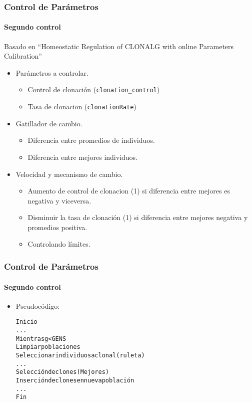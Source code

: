 \frame
{
\frametitle{Control de Parámetros}
\framesubtitle{Segundo control}
Basado en ``Homeostatic Regulation of CLONALG with online Parameters Calibration''
\begin{itemize}
	\item Parámetros a controlar.
	\begin{itemize}
		\item Control de clonación (\texttt{clonation\_control}) 
		\item Tasa de clonacion (\texttt{clonationRate}) \blue{[0,1]} 
	\end{itemize}
	\item Gatillador de cambio.
	\begin{itemize}
		\item Diferencia entre promedios de individuos.
		\item Diferencia entre mejores individuos.
	\end{itemize}
	\item Velocidad y mecanismo de cambio.
	\begin{itemize}
		\item Aumento de control de clonacion (1) si diferencia entre mejores es negativa y viceversa.
		\item Disminuir la tasa de clonación (1) si diferencia entre mejores negativa y promedios positiva.
		\item Controlando límites.
	\end{itemize}
\end{itemize}
}

\begin{frame}[t,fragile]
\frametitle{Control de Parámetros}
\framesubtitle{Segundo control}
\begin{itemize}
	\item Pseudocódigo:
\tiny{
\begin{alltt}
    Inicio
	...
    Mientras g < GENS
        Limpiar poblaciones
        Seleccionar individuos a clonal (ruleta)
		...
        Selección de clones (Mejores)
        Inserción de clones en nueva población
		...
    Fin
\end{alltt}
}
\end{itemize}
\end{frame}



